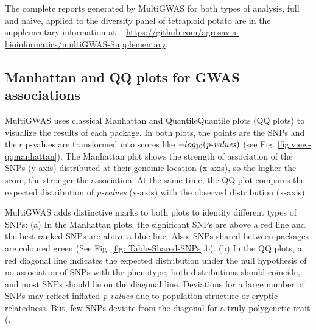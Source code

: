 \documentclass{article}
\begin{document}
The complete reports generated by MultiGWAS for both types of analysis, full and naive, applied to the diversity panel of tetraploid potato are in the supplementary information at ~ \url{https://github.com/agrosavia-bioinformatics/multiGWAS-Supplementary}.



\subsection{Manhattan and QQ plots for GWAS associations }

MultiGWAS uses classical Manhattan and Quantile\textendash Quantile plots (QQ plots) to visualize the results of each package. In both plots, the points are the SNPs and their p-values are transformed into scores like $-log_{10}({\operatorname{\mathit{p-values}}})$ (see Fig. \ref{fig:view-qqmanhattan}). The Manhattan plot shows the strength of association of the SNPs (y-axis) distributed at their genomic location (x-axis), so the higher the score, the stronger the association. At the same time, the QQ plot compares the expected distribution of \emph{p-values} (y-axis) with the observed distribution (x-axis). 

MultiGWAS adds distinctive marks to both plots to identify different types of SNPs: (a) In the Manhattan plots, the significant SNPs are above a red line and the best-ranked SNPs are above a blue line. Also, SNPs shared between packages are coloured green (See Fig. \ref{fig: Table-Shared-SNPs}.b). (b) In the QQ plots, a red diagonal line indicates the expected distribution under the null hypothesis of no association of SNPs with the phenotype, both distributions should coincide, and most SNPs should lie on the diagonal line. Deviations for a large number of SNPs may reflect inflated {\emph{p-values }}due to population structure or cryptic relatedness. But, few SNPs deviate from the diagonal for a truly polygenetic trait (\cite{Power2016}.
\end{document}
